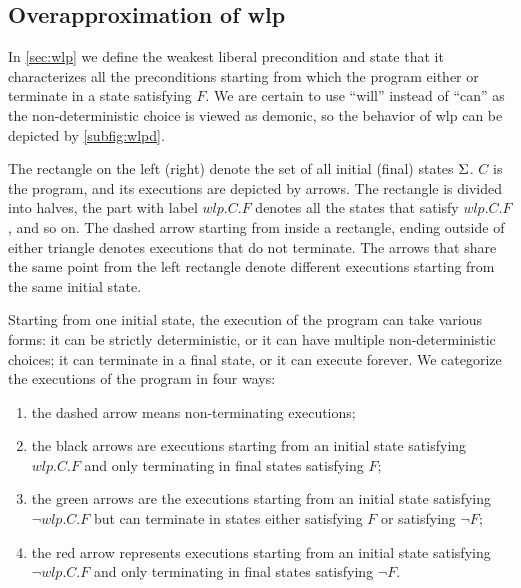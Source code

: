 \subsection{Overapproximation of wlp}
In \autoref{sec:wlp} we define the weakest liberal precondition and state that it characterizes all the preconditions starting from which the program either  or  terminate in a state satisfying $F$. 
We are certain to use ``will'' instead of ``can'' as the non-deterministic choice is viewed as demonic, so the behavior of wlp can be depicted by \autoref{subfig:wlpd}. 

The rectangle on the left (right) denote the set of all initial (final) states $\S$. 
$C$ is the program, and its executions are depicted by arrows. 
The rectangle is divided into halves, the part with label $wlp.C.F$ denotes all the states that satisfy $wlp.C.F$, and so on. 
The dashed arrow starting from inside a rectangle, ending outside of either triangle denotes executions that do not terminate. 
The arrows that share the same point from the left rectangle denote different executions starting from the same initial state. 

Starting from one initial state, the execution of the program can take various forms: it can be strictly deterministic, or it can have multiple non-deterministic choices; it can terminate in a final state, or it can execute forever. 
We categorize the executions of the program in four ways: 
\begin{enumerate}
	\item the dashed arrow means non-terminating executions; 
	\item the black arrows are executions starting from an initial state satisfying $wlp.C.F$ and only terminating in final states satisfying $F$; 
	\item the green arrows are the executions starting from an initial state satisfying $\neg wlp.C.F$ but can terminate in states either satisfying $F$ or satisfying $\neg F$;
	\item the red arrow represents executions starting from an initial state satisfying $\neg wlp.C.F$ and only terminating in final states satisfying $\neg F$. 
\end{enumerate}


